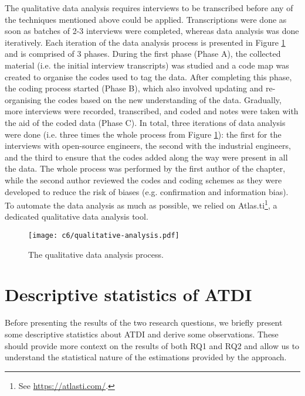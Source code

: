 The qualitative data analysis requires interviews to be transcribed before any of the techniques mentioned above could be applied.
Transcriptions were done as soon as batches of 2-3 interviews were completed, whereas data analysis was done iteratively.
Each iteration of the data analysis process is presented in Figure \ref{c6:fig:qualitative-analysis} and is comprised of 3 phases. During the first phase (Phase A), the collected material (i.e. the initial interview transcripts) was studied and a code map was created to organise the codes used to tag the data.
After completing this phase, the coding process started (Phase B), which also involved updating and re-organising the codes based on the new understanding of the data.
Gradually, more interviews were recorded, transcribed, and coded and notes were taken with the aid of the coded data (Phase C).
In total, three iterations of data analysis were done (i.e. three times the whole process from Figure \ref{c6:fig:qualitative-analysis}): the first for the interviews with open-source engineers, the second with the industrial engineers, and the third to ensure that the codes added along the way were present in all the data.
The whole process was performed by the first author of the chapter, while the second author reviewed the codes and coding schemes as they were developed to reduce the risk of biases (e.g. confirmation and information bias).
To automate the data analysis as much as possible, we relied on Atlas.ti\footnote{See \url{https://atlasti.com/}.}, a dedicated qualitative data analysis tool.

\begin{figure}
    \centering
    \texttt{[image: c6/qualitative-analysis.pdf]}
    \caption{The qualitative data analysis process.}
    \label{c6:fig:qualitative-analysis}
\end{figure}

\section{Descriptive statistics of ATDI}\label{c6:sec:descriptive-statistics}
Before presenting the results of the two research questions, we briefly present some descriptive statistics about ATDI and derive some observations.
These should provide more context on the results of both RQ1 and RQ2 and allow us to understand the statistical nature of the estimations provided by the approach.

